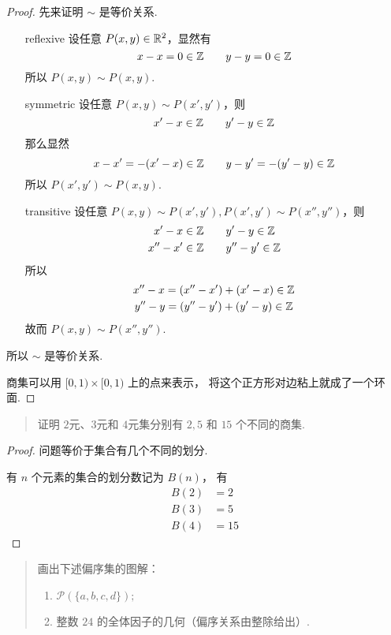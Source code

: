 \begin{proof}
先来证明 $\sim$ 是等价关系.

\begin{enumerate}
    \item[reflexive] 设任意 $P(x,y) \in \mathbb{R}^2$，显然有
    \begin{equation}
        x - x = 0 \in \mathbb{Z} \qquad y - y = 0 \in \mathbb{Z}
    \end{equation}
    所以 $P(x,y) \sim P(x,y)$.
    
    \item[symmetric] 设任意 $P(x,y) \sim P(x', y')$，则
    \begin{equation}
        x' - x \in \mathbb{Z} \qquad y' - y \in \mathbb{Z}
    \end{equation}
    那么显然
    \begin{equation}
        x - x' = -(x' - x) \in \mathbb{Z} \qquad
        y - y' = -(y' - y) \in \mathbb{Z}
    \end{equation}
    所以 $P(x', y') \sim P(x, y)$.
    
    \item[transitive] 设任意 $P(x,y) \sim P(x', y'), P(x', y') \sim P(x'', y'')$，则
    \begin{gather}
        x' - x \in \mathbb{Z} \qquad y' - y \in \mathbb{Z} \\
        x'' - x' \in \mathbb{Z} \qquad y'' - y' \in \mathbb{Z}
    \end{gather}
    所以
    \begin{gather}
        x'' - x = (x'' - x') + (x' - x) \in \mathbb{Z} \\
        y'' - y = (y'' - y') + (y' - y) \in \mathbb{Z}
    \end{gather}
    故而 $P(x,y) \sim P(x'', y'')$.
\end{enumerate}
所以 $\sim$ 是等价关系.

商集可以用 $[0,1) \times [0,1)$ 上的点来表示，
将这个正方形对边粘上就成了一个环面.

\end{proof}


\begin{quotation}
    证明 $2$元、$3$元和 $4$元集分别有
    $2, 5$ 和 $15$ 个不同的商集.
\end{quotation}

\begin{proof}
问题等价于集合有几个不同的划分.

有 $n$ 个元素的集合的划分数记为 $B(n)$，
有
\begin{align}
    B(2) &= 2 \\
    B(3) &= 5 \\
    B(4) &= 15
\end{align}
\end{proof}


\begin{quotation}
    画出下述偏序集的图解：
    \begin{enumerate}
        \item $\mathcal{P}(\{ a, b, c, d \});$
        \item 整数 $24$ 的全体因子的几何（偏序关系由整除给出）.
    \end{enumerate}
\end{quotation}


\endinput
